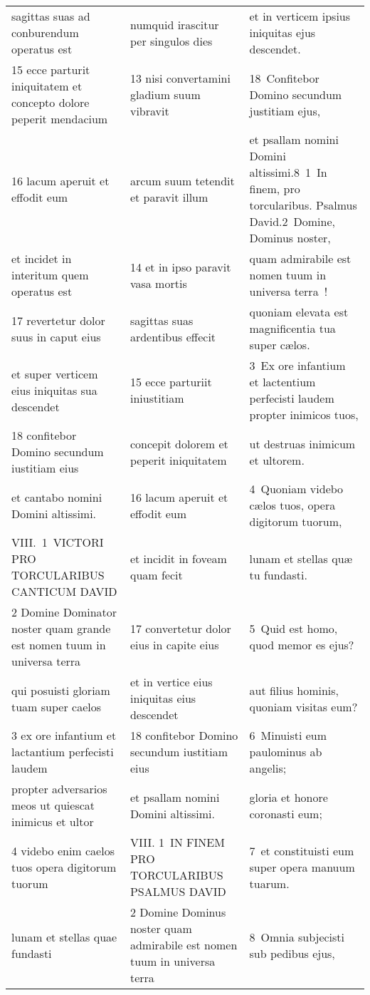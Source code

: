 \documentclass{article}
\begin{document}
\begin{longtable}{@{}p{}p{}p{}@{}}
sagittas suas ad conburendum operatus est	&	numquid irascitur per singulos dies	&	et in verticem ipsius iniquitas ejus descendet.	\\
15 ecce parturit iniquitatem et concepto dolore peperit mendacium	&	13 nisi convertamini gladium suum vibravit	&	18 Confitebor Domino secundum justitiam ejus,	\\
16 lacum aperuit et effodit eum	&	arcum suum tetendit et paravit illum	&	et psallam nomini Domini altissimi.8 1 In finem, pro torcularibus. Psalmus David.2 Domine, Dominus noster,	\\
et incidet in interitum quem operatus est	&	14 et in ipso paravit vasa mortis	&	quam admirabile est nomen tuum in universa terra !	\\
17 revertetur dolor suus in caput eius	&	sagittas suas ardentibus effecit	&	quoniam elevata est magnificentia tua super cælos.	\\
et super verticem eius iniquitas sua descendet	&	15 ecce parturiit iniustitiam	&	3 Ex ore infantium et lactentium perfecisti laudem propter inimicos tuos,	\\
18 confitebor Domino secundum iustitiam eius	&	concepit dolorem et peperit iniquitatem	&	ut destruas inimicum et ultorem.	\\
et cantabo nomini Domini altissimi.	&	16 lacum aperuit et effodit eum	&	4 Quoniam videbo cælos tuos, opera digitorum tuorum,	\\
VIII. 1 VICTORI PRO TORCULARIBUS CANTICUM DAVID	&	et incidit in foveam quam fecit	&	lunam et stellas quæ tu fundasti.	\\
2 Domine Dominator noster quam grande est nomen tuum in universa terra	&	17 convertetur dolor eius in capite eius	&	5 Quid est homo, quod memor es ejus?	\\
qui posuisti gloriam tuam super caelos	&	et in vertice eius iniquitas eius descendet	&	aut filius hominis, quoniam visitas eum?	\\
3 ex ore infantium et lactantium perfecisti laudem	&	18 confitebor Domino secundum iustitiam eius	&	6 Minuisti eum paulominus ab angelis;	\\
propter adversarios meos ut quiescat inimicus et ultor	&	et psallam nomini Domini altissimi.	&	gloria et honore coronasti eum;	\\
4 videbo enim caelos tuos opera digitorum tuorum	&	VIII. 1 IN FINEM PRO TORCULARIBUS PSALMUS DAVID	&	7 et constituisti eum super opera manuum tuarum.	\\
lunam et stellas quae fundasti	&	2 Domine Dominus noster quam admirabile est nomen tuum in universa terra	&	8 Omnia subjecisti sub pedibus ejus,	\\

\end{longtable}
\end{document}
